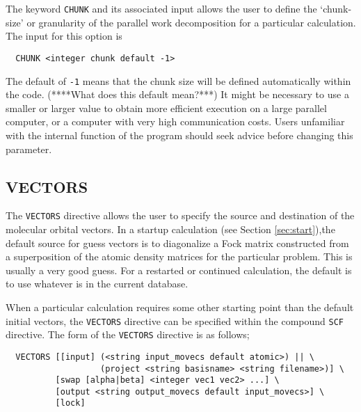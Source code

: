 
The keyword \verb+CHUNK+ and its associated input allows the user to
define the  `chunk-size' or granularity of the
parallel work decomposition for a particular calculation.  The input for this
option is
\begin{verbatim}
  CHUNK <integer chunk default -1>
\end{verbatim}

The default of \verb+-1+ means that the chunk size will be defined
automatically within the code.  
\Large 
(****What does this default mean?***)
\normalsize  
It might be necessary to use a smaller
or larger value to obtain more efficient execution on a large
parallel computer, or a computer with very high communication costs.
Users unfamiliar with the internal function of the program should seek
advice before changing this parameter.

\subsection{VECTORS}
\label{sec:vectors}

The \verb+VECTORS+ directive allows the user to specify the source and 
destination of the molecular orbital vectors.  In a startup calculation 
(see Section \ref{sec:start}),the default
source for guess vectors is to diagonalize a Fock matrix constructed
from a superposition of the atomic density matrices for the particular
problem.  This is usually
a very good guess.   For a restarted or continued calculation, the default
is to use whatever is in the current database.

When a particular calculation requires some other starting point than 
the default initial vectors, the \verb+VECTORS+ directive can be specified
within the compound 
\verb+SCF+ directive.  The form of the \verb+VECTORS+ directive is
as follows;  


\begin{verbatim}
  VECTORS [[input] (<string input_movecs default atomic>) || \
                   (project <string basisname> <string filename>)] \
          [swap [alpha|beta] <integer vec1 vec2> ...] \
          [output <string output_movecs default input_movecs>] \
          [lock]
\end{verbatim}

